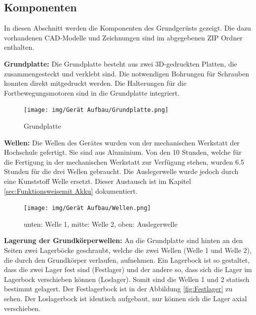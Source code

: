 \subsection{Komponenten}
\label{subsec:Komponenten}

In diesen Abschnitt werden die Komponenten des Grundgerüsts gezeigt. Die dazu vorhandenen CAD-Modelle und Zeichnungen sind im abgegebenen ZIP Ordner enthalten.

\textbf{Grundplatte:} Die Grundplatte besteht aus zwei 3D-gedruckten Platten, die zusammengesteckt und verklebt sind. Die notwendigen Bohrungen für Schrauben konnten direkt mitgedruckt werden. Die Halterungen für die Fortbewegungsmotoren sind in die Grundplatte integriert.

\begin{figure}[H]
  \texttt{[image: img/Gerät Aufbau/Grundplatte.png]}
  \centering
  \caption{Grundplatte}
  \label{fig:Grundplatte}
\end{figure}

\textbf{Wellen:} Die Wellen des Gerätes wurden von der mechanischen Werkstatt der Hochschule gefertigt. Sie sind aus Aluminium. Von den 10 Stunden, welche für die Fertigung in der mechanischen Werkstatt zur Verfügung stehen, wurden 6.5 Stunden für die drei Wellen gebraucht. Die Auslegerwelle wurde jedoch durch eine Kunststoff Welle ersetzt. Dieser Austausch ist im Kapitel \ref{sec:Funktionsweisemit Akku} dokumentiert.

\begin{figure}[H]
  \texttt{[image: img/Gerät Aufbau/Wellen.png]}
  \centering
  \caption{unten: Welle 1, mitte: Welle 2, oben: Auslegerwelle}
  \label{fig:Wellen}
\end{figure}

\newpage

\textbf{Lagerung der Grundkörperwellen:} An die Grundplatte sind hinten an den Seiten zwei Lagerböcke geschraubt, welche die zwei Wellen (Welle 1 und Welle 2), die durch den Grundkörper verlaufen, aufnehmen. Ein Lagerbock ist so gestaltet, dass die zwei Lager fest sind (Festlager) und der andere so, dass sich die Lager im Lagerbock verschieben können (Loslager). Somit sind die Wellen 1 und 2 statisch bestimmt gelagert. Der Festlagerbock ist in der Abbildung \ref{fig:Festlager} zu sehen. Der Loslagerbock ist identisch aufgebaut, nur können sich die Lager axial verschieben.

